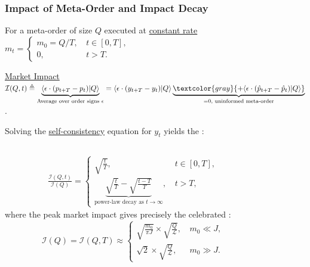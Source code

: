 \documentclass{beamer}
\begin{document}
\begin{frame}
\frametitle{Impact of Meta-Order and Impact Decay}
{
\footnotesize{
For a meta-order of size $Q$ executed at \underline{constant rate}
$
m_t = \begin{cases}
 m_0 = Q/T, \, &t\in[0,T],\\
 0, \, &t>T.
\end{cases}
$

\underline{Market Impact} $\mathcal{I}(Q,t) \triangleq \underbrace{\langle \epsilon\cdot(p_{t+T} - p_t) |Q\rangle}_{\text{Average over order signs } \epsilon}
=  \langle \epsilon\cdot(y_{t+T} - y_t) |Q\rangle \underbrace{\textcolor{gray}{+ \langle \epsilon\cdot(\hat{p}_{t+T} - \hat{p}_t) |Q\rangle}}_{\text{=0, uninformed meta-order}}$.

Solving the \underline{self-consistency} equation for $y_t$ yields the \textit{\color{blue}{impact profile}}:
\begin{columns}
\begin{column}{0.55\textwidth}
\begin{align*}
\frac{\mathcal{I}(Q,t)}{\mathcal{I}(Q)} = 
\begin{cases}
\sqrt{\frac{t}{T}}, \, &t\in[0,T],\\
\underbrace{\sqrt{\frac{t}{T}} - \sqrt{\frac{t-T}{T}}}_{\text{power-law decay as } t\rightarrow\infty}, \,  &t>T,
\end{cases}
\end{align*}
where the peak market impact gives precisely the celebrated \textit{\color{blue}{square-root impact law}}:
$$
\mathcal{I}(Q) = \mathcal{I}(Q,T) \approx \begin{cases}
\sqrt{\frac{m_0}{\pi J}}\times\sqrt{\frac{Q}{\mathcal{L}}}, \, & m_0 \ll J,\\
\sqrt{2}\times \sqrt{\frac{Q}{\mathcal{L}}}, \, & m_0 \gg J.
\end{cases}
$$
\end{column}
\begin{column}{0.45\textwidth}  %
    \begin{center}

\end{center}
\end{column}
\end{columns}}}
\end{frame}
\end{document}
